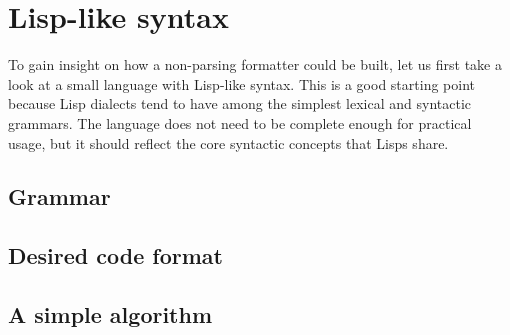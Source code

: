 \chapter{Lisp-like syntax}
To gain insight on how a non-parsing formatter could be built,
let us first take a look at a small language with Lisp-like syntax.
This is a good starting point because Lisp dialects tend to
have among the simplest lexical and syntactic grammars.
The language does not need to be complete enough for practical usage,
but it should reflect the core syntactic concepts that Lisps share.

\section{Grammar}
\section{Desired code format}
\section{A simple algorithm}
